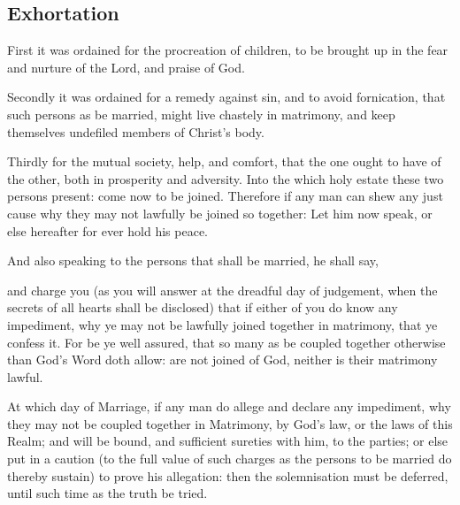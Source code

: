 \subsection{Exhortation}
First it was ordained for the procreation of children, to be brought up in the fear and nurture of the Lord, and praise of God.\par
Secondly it was ordained for a remedy against sin, and to avoid fornication, that such persons as be married, might live chastely in matrimony, and keep themselves undefiled members of Christ's body.\par
Thirdly for the mutual society, help, and comfort, that the one ought to have of the other, both in prosperity and adversity. Into the which holy estate these two persons present: come now to be joined. Therefore if any man can shew any just cause why they may not lawfully be joined so together: Let him now speak, or else hereafter for ever hold his peace.
\begin{rubric}
	And also speaking to the persons that shall be married, he shall say,
\end{rubric}
 and charge you (as you will answer at the dreadful day of judgement, when the secrets of all hearts shall be disclosed) that if either of you do know any impediment, why ye may not be lawfully joined together in matrimony, that ye confess it. For be ye well assured, that so many as be coupled together otherwise than God's Word doth allow: are not joined of God, neither is their matrimony lawful.
\begin{rubric}
    At which day of Marriage, if any man do allege and declare any impediment, why they may not be coupled together in Matrimony, by God's law, or the laws of this Realm; and will be bound, and sufficient sureties with him, to the parties; or else put in a caution (to the full value of such charges as the persons to be married do thereby sustain) to prove his allegation: then the solemnisation must be deferred, until such time as the truth be tried.
\end{rubric}

